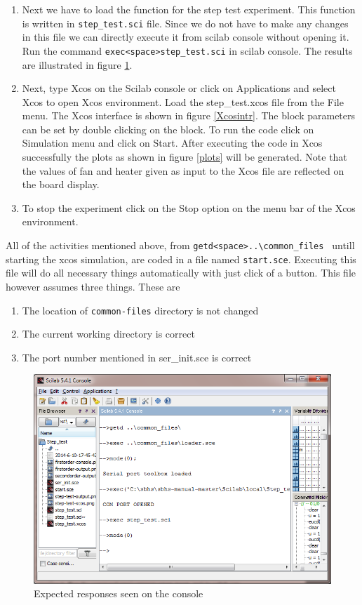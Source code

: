 \begin{enumerate}
\item Next we have to load the function for the step test experiment. This function is written in {\tt step\_test.sci} file. Since we do not have to make any changes in this file we can directly execute it from scilab console without opening it. Run the command {\tt exec<space>step\_test.sci} in scilab console.  The results are illustrated in figure \ref{loader}. 

\item Next, type {\ttfamily Xcos} on the Scilab console or click on { \ttfamily Applications} and select {\ttfamily Xcos} to open Xcos environment. Load the {\ttfamily step\_test.xcos} file from the { \ttfamily File} menu. The Xcos interface is shown in figure \ref{Xcosintr}. The block parameters can be set by double clicking on the block. To run the code click on {\ttfamily Simulation} menu and click on {\ttfamily Start}. After executing the code in Xcos successfully the plots as shown in figure \ref{plots} will be generated. Note that the values of fan and heater given as input to the Xcos file are reflected on the board display. 
\item To stop the experiment click on the {\ttfamily Stop} option on the menu bar of the Xcos environment. 
\end{enumerate}



All of the activities mentioned above, from {\tt getd<space>..\textbackslash common\_files\ } untill starting the xcos simulation, are coded in a file named {\tt start.sce}. Executing this file will do all necessary things automatically with just click of a button. This file however assumes three things. These are

\begin{enumerate}
\item The location of {\tt common-files} directory is not changed 
\item The current working directory is correct
\item The port number mentioned in  {\ttfamily ser\_init.sce} is correct
\end{enumerate}

\begin{figure}
\centering
\includegraphics[width=0.7\linewidth]{using-sbhs/commands.png}
\caption{Expected responses seen on the console}
\label{loader}
\end{figure}


